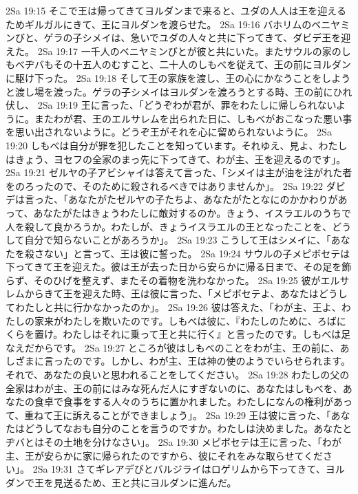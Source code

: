 2Sa 19:15  そこで王は帰ってきてヨルダンまで来ると、ユダの人人は王を迎えるためギルガルにきて、王にヨルダンを渡らせた。
2Sa 19:16  バホリムのベニヤミンびと、ゲラの子シメイは、急いでユダの人々と共に下ってきて、ダビデ王を迎えた。
2Sa 19:17  一千人のベニヤミンびとが彼と共にいた。またサウルの家のしもべヂバもその十五人のむすこと、二十人のしもべを従えて、王の前にヨルダンに駆け下った。
2Sa 19:18  そして王の家族を渡し、王の心にかなうことをしようと渡し場を渡った。ゲラの子シメイはヨルダンを渡ろうとする時、王の前にひれ伏し、
2Sa 19:19  王に言った、「どうぞわが君が、罪をわたしに帰しられないように。またわが君、王のエルサレムを出られた日に、しもべがおこなった悪い事を思い出されないように。どうぞ王がそれを心に留められないように。
2Sa 19:20  しもべは自分が罪を犯したことを知っています。それゆえ、見よ、わたしはきょう、ヨセフの全家のまっ先に下ってきて、わが主、王を迎えるのです」。
2Sa 19:21  ゼルヤの子アビシャイは答えて言った、「シメイは主が油を注がれた者をのろったので、そのために殺されるべきではありませんか」。
2Sa 19:22  ダビデは言った、「あなたがたゼルヤの子たちよ、あなたがたとなにのかかわりがあって、あなたがたはきょうわたしに敵対するのか。きょう、イスラエルのうちで人を殺して良かろうか。わたしが、きょうイスラエルの王となったことを、どうして自分で知らないことがあろうか」。
2Sa 19:23  こうして王はシメイに、「あなたを殺さない」と言って、王は彼に誓った。
2Sa 19:24  サウルの子メピボセテは下ってきて王を迎えた。彼は王が去った日から安らかに帰る日まで、その足を飾らず、そのひげを整えず、またその着物を洗わなかった。
2Sa 19:25  彼がエルサレムからきて王を迎えた時、王は彼に言った、「メピボセテよ、あなたはどうしてわたしと共に行かなかったのか」。
2Sa 19:26  彼は答えた、「わが主、王よ、わたしの家来がわたしを欺いたのです。しもべは彼に、『わたしのために、ろばにくらを置け。わたしはそれに乗って王と共に行く』と言ったのです。しもべは足なえだからです。
2Sa 19:27  ところが彼はしもべのことをわが主、王の前に、あしざまに言ったのです。しかし、わが主、王は神の使のようでいらせられます。それで、あなたの良いと思われることをしてください。
2Sa 19:28  わたしの父の全家はわが主、王の前にはみな死んだ人にすぎないのに、あなたはしもべを、あなたの食卓で食事をする人々のうちに置かれました。わたしになんの権利があって、重ねて王に訴えることができましょう」。
2Sa 19:29  王は彼に言った、「あなたはどうしてなおも自分のことを言うのですか。わたしは決めました。あなたとヂバとはその土地を分けなさい」。
2Sa 19:30  メピボセテは王に言った、「わが主、王が安らかに家に帰られたのですから、彼にそれをみな取らせてください」。
2Sa 19:31  さてギレアデびとバルジライはロゲリムから下ってきて、ヨルダンで王を見送るため、王と共にヨルダンに進んだ。

